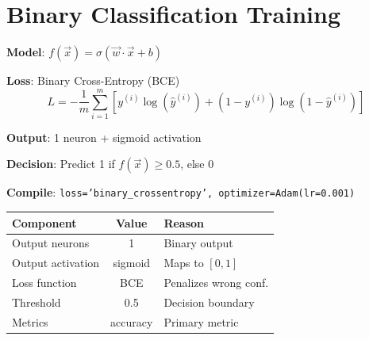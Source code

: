 \documentclass[11pt,a4paper]{article}
\begin{document}
\section{Binary Classification Training}

\begin{definitionbox}

\textbf{Model}: $f(\vec{x}) = \sigma(\vec{w} \cdot \vec{x} + b)$

\textbf{Loss}: Binary Cross-Entropy (BCE)
\[L = -\frac{1}{m}\sum_{i=1}^{m}[y^{(i)}\log(\hat{y}^{(i)}) + (1-y^{(i)})\log(1-\hat{y}^{(i)})]\]

\textbf{Output}: 1 neuron + sigmoid activation

\textbf{Decision}: Predict 1 if $f(\vec{x}) \geq 0.5$, else 0
\end{definitionbox}

\begin{examplebox}

\begin{center}
\end{center}
\vspace{-0.5em}
\textbf{Compile}: \texttt{loss='binary\_crossentropy', optimizer=Adam(lr=0.001)}
\end{examplebox}

\begin{definitionbox}

\begin{tabular}{@{}l|c|l@{}}
\textbf{Component} & \textbf{Value} & \textbf{Reason} \\
\hline
Output neurons & 1 & Binary output \\
Output activation & sigmoid & Maps to $[0,1]$ \\
Loss function & BCE & Penalizes wrong conf. \\
Threshold & 0.5 & Decision boundary \\
Metrics & accuracy & Primary metric \\
\end{tabular}
\end{definitionbox}
\end{document}
